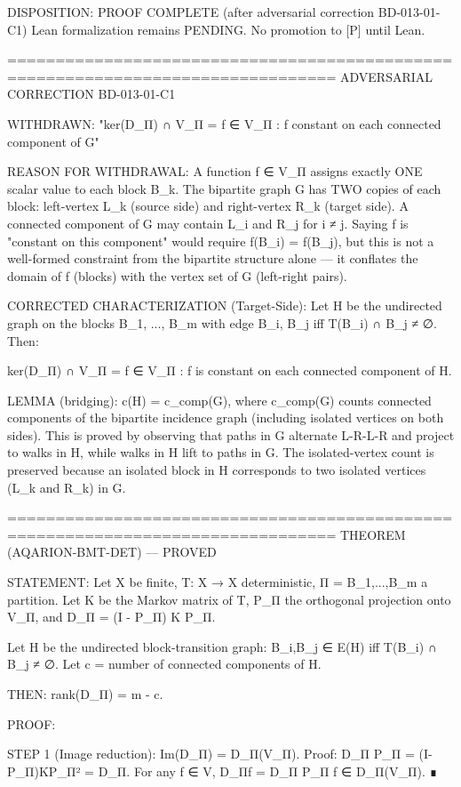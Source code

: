 DISPOSITION: PROOF COMPLETE (after adversarial correction BD-013-01-C1)
Lean formalization remains PENDING. No promotion to [P] until Lean.

================================================================================
ADVERSARIAL CORRECTION BD-013-01-C1

WITHDRAWN:
"ker(D_Π) ∩ V_Π = {f ∈ V_Π : f constant on each connected component of G}"

REASON FOR WITHDRAWAL:
A function f ∈ V_Π assigns exactly ONE scalar value to each block B_k.
The bipartite graph G has TWO copies of each block: left-vertex L_k
(source side) and right-vertex R_k (target side). A connected component
of G may contain L_i and R_j for i ≠ j. Saying f is "constant on this
component" would require f(B_i) = f(B_j), but this is not a well-formed
constraint from the bipartite structure alone — it conflates the domain
of f (blocks) with the vertex set of G (left-right pairs).

CORRECTED CHARACTERIZATION (Target-Side):
Let H be the undirected graph on the blocks {B_1, ..., B_m} with edge
{B_i, B_j} iff T(B_i) ∩ B_j ≠ ∅. Then:

ker(D_Π) ∩ V_Π = {f ∈ V_Π : f is constant on each connected component of H}.

LEMMA (bridging): c(H) = c_comp(G), where c_comp(G) counts connected
components of the bipartite incidence graph (including isolated vertices
on both sides). This is proved by observing that paths in G alternate
L-R-L-R and project to walks in H, while walks in H lift to paths in G.
The isolated-vertex count is preserved because an isolated block in H
corresponds to two isolated vertices (L_k and R_k) in G.

================================================================================
THEOREM (AQARION-BMT-DET) — PROVED

STATEMENT:
Let X be finite, T: X → X deterministic, Π = {B_1,...,B_m} a partition.
Let K be the Markov matrix of T, P_Π the orthogonal projection onto V_Π,
and D_Π = (I - P_Π) K P_Π.

Let H be the undirected block-transition graph: {B_i,B_j} ∈ E(H) iff
T(B_i) ∩ B_j ≠ ∅. Let c = number of connected components of H.

THEN: rank(D_Π) = m - c.

PROOF:

STEP 1 (Image reduction): Im(D_Π) = D_Π(V_Π).
Proof: D_Π P_Π = (I-P_Π)KP_Π² = D_Π. For any f ∈ V, D_Πf = D_Π P_Π f ∈ D_Π(V_Π).
∎

